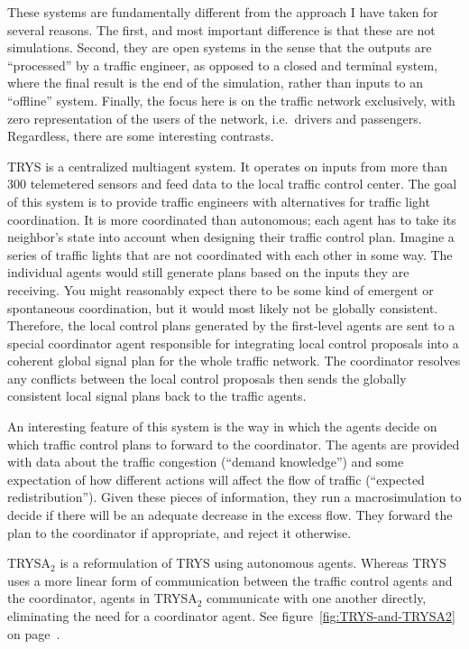 \documentclass[11pt,letterpaper,onecolumn,twoside,openright,final]{report}
\begin{document}
These systems are fundamentally different from the approach I have taken for several reasons.
The first, and most important difference is that these are not simulations.
Second, they are open systems in the sense that the outputs are ``processed'' by a traffic engineer, as opposed to a closed and terminal system, where the final result is the end of the simulation, rather than inputs to an ``offline'' system.
Finally, the focus here is on the traffic network exclusively, with zero representation of the users of the network, i.e.~drivers and passengers.
Regardless, there are some interesting contrasts.

TRYS is a centralized multiagent system.
It operates on inputs from more than 300 telemetered sensors and feed data to the local traffic control center.
The goal of this system is to provide traffic engineers with alternatives for traffic light coordination.
It is more coordinated than autonomous; each agent has to take its neighbor's state into account when designing their traffic control plan.
Imagine a series of traffic lights that are not coordinated with each other in some way.
The individual agents would still generate plans based on the inputs they are receiving.
You might reasonably expect there to be some kind of emergent or spontaneous coordination, but it would most likely not be globally consistent.
Therefore, the local control plans generated by the first-level agents are sent to a special coordinator agent responsible for integrating local control proposals into a coherent global signal plan for the whole traffic network.
The coordinator resolves any conflicts between the local control proposals then sends the globally consistent local signal plans back to the traffic agents.

An interesting feature of this system is the way in which the agents decide on which traffic control plans to forward to the coordinator.
The agents are provided with data about the traffic congestion (``demand knowledge'') and some expectation of how different actions will affect the flow of traffic (``expected redistribution'').
Given these pieces of information, they run a macrosimulation to decide if there will be an adequate decrease in the excess flow.
They forward the plan to the coordinator if appropriate, and reject it otherwise.

TRYSA$_{2}$ is a reformulation of TRYS using autonomous agents.
Whereas TRYS uses a more linear form of communication between the traffic control agents and the coordinator, agents in TRYSA$_{2}$ communicate with one another directly, eliminating the need for a coordinator agent.
See figure~\ref{fig:TRYS-and-TRYSA2} on page~\pageref{fig:TRYS-and-TRYSA2}.
\end{document}
